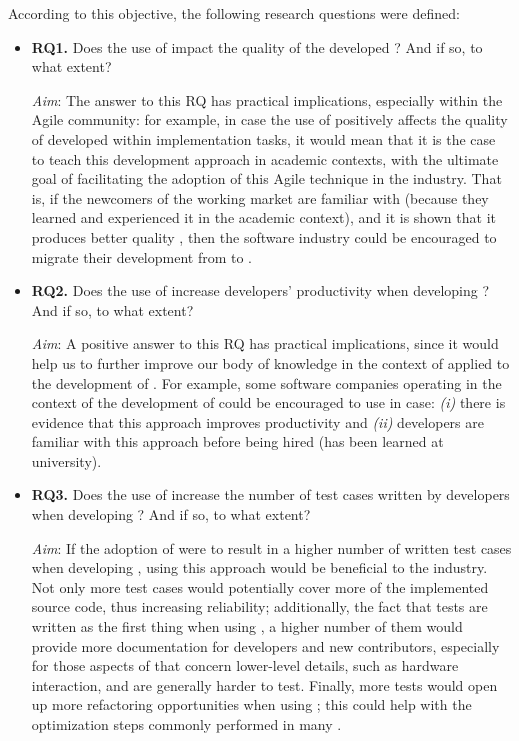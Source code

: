\noindent According to this objective, the following research questions were defined:
\begin{itemize}
    \item \textbf{RQ1.} Does the use of \tdd impact the quality of the developed \es? And if so, to what extent?

    \noindent\textit{Aim}: The answer to this RQ has practical implications, especially within the Agile community: for example, in case the use of \tdd positively affects the quality of \ess developed within implementation tasks, it would mean that it is the case to teach this development approach in academic contexts, with the ultimate goal of facilitating the adoption of this Agile technique in the industry. 
    That is, if the newcomers of the working market are familiar with \tdd (because they learned and experienced it in the academic context), and it is shown that it produces better quality \ess, then the software industry could be encouraged to migrate their development from \notdd to \tdd.

    \item \textbf{RQ2.} Does the use of \tdd increase developers' productivity when developing \ess? And if so, to what extent?

    \noindent\textit{Aim}: A positive answer to this RQ has practical implications, since it would help us to further improve our body of knowledge in the context of \tdd applied to the development of \ess. For example, some software companies operating in the context of the development of \ess could be encouraged to use \tdd in case: \textit{(i)} there is evidence that this approach improves productivity and \textit{(ii)} developers are familiar with this approach before being hired (\eg \tdd has been learned at university).

    \item \textbf{RQ3.} Does the use of \tdd increase the number of test cases written by developers when developing \ess? And if so, to what extent?

    \noindent\textit{Aim}: If the adoption of \tdd were to result in a higher number of written test cases when developing \ess, using this approach would be beneficial to the industry. Not only more test cases would potentially cover more of the implemented source code, thus increasing reliability; additionally, the fact that tests are written as the first thing when using \tdd, a higher number of them would provide more documentation for developers and new contributors, especially for those aspects of \ess that concern lower-level details, such as hardware interaction, and are generally harder to test. Finally, more tests would open up more refactoring opportunities when using \tdd; this could help with the optimization steps commonly performed in many \ess.
\end{itemize}




